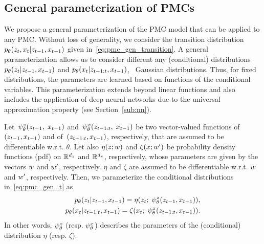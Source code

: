 \subsection{General parameterization of PMCs}
\label{sec:pmc_parameterization}
We propose a general parameterization of the PMC model that can be applied to
any PMC. Without loss of generality, we consider the transition distribution 
$p_{\theta}(z_t,x_t|z_{t-1},x_{t-1})$
given in~\eqref{eq:pmc_gen_transition}.
A general parameterization allows us to consider different any (conditional) distributions
$p_{\theta}(z_t|z_{t-1},x_{t-1})$ and $p_{\theta}(x_t|z_{t-1:t},x_{t-1})$,
\eg~Gaussian distributions.
Thus, for fixed  distributions, the parameters are learned based on functions 
of the conditional variables. 
This parameterization  extends beyond linear functions and also includes the application of 
deep neural networks due to the universal approximation property
(see Section~\ref{sub:nn}).

Let~$\psi^{z}_{\theta}(z_{t-1}, \;x_{t-1})$ and~$\psi^{x}_{\theta}(z_{t-1:t},\;x_{t-1} )$  
be two vector-valued functions 
of ~$(z_{t-1},x_{t-1})$ and of~$(z_{t-1:t},x_{t-1})$, respectively, 
that are assumed to be differentiable w.r.t. $\theta$. 
Let also $\eta(z; w )$ and $\zeta(x;w')$
be probability density functions (pdf) on $\mathbb{R}^{d_z}$ 
and $\mathbb{R}^{d_x}$, respectively,
whose parameters are given by the vectors $w$ and $w'$, respectively.
$\eta$ and $\zeta$ are assumed to be differentiable w.r.t. $w$ and $w'$, 
respectively.
Then, we parameterize the conditional distributions in~\eqref{eq:pmc_gen_t} 
as 
\begin{eqnarray}
\label{pmc-theta-1-gen}
p_{\theta}(z_t|z_{t-1},x_{t-1})=\eta(z_t; \;  \psi^{z}_{\theta}(z_{t-1},x_{t-1}) )  \text{,} \\
\label{pmc-theta-2-gen}
p_{\theta}(x_t|z_{t-1:t},x_{t-1})=\zeta(x_t;\; \psi^{x}_{\theta}(z_{t-1:t},x_{t-1} ) ) \text{.}
\end{eqnarray}
In other words, $\psi^{z}_{\theta}$ (resp. $\psi^{x}_{\theta}$)
describes the parameters of the (conditional) distribution $\eta$ 
(resp. $\zeta$).

